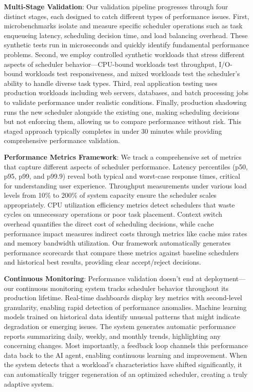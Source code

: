 \textbf{Multi-Stage Validation}: Our validation pipeline progresses through four distinct stages, each designed to catch different types of performance issues. First, microbenchmarks isolate and measure specific scheduler operations such as task enqueueing latency, scheduling decision time, and load balancing overhead. These synthetic tests run in microseconds and quickly identify fundamental performance problems. Second, we employ controlled synthetic workloads that stress different aspects of scheduler behavior—CPU-bound workloads test throughput, I/O-bound workloads test responsiveness, and mixed workloads test the scheduler's ability to handle diverse task types. Third, real application testing uses production workloads including web servers, databases, and batch processing jobs to validate performance under realistic conditions. Finally, production shadowing runs the new scheduler alongside the existing one, making scheduling decisions but not enforcing them, allowing us to compare performance without risk. This staged approach typically completes in under 30 minutes while providing comprehensive performance validation.

\textbf{Performance Metrics Framework}: We track a comprehensive set of metrics that capture different aspects of scheduler performance. Latency percentiles (p50, p95, p99, and p99.9) reveal both typical and worst-case response times, critical for understanding user experience. Throughput measurements under various load levels from 10\% to 200\% of system capacity ensure the scheduler scales appropriately. CPU utilization efficiency metrics detect schedulers that waste cycles on unnecessary operations or poor task placement. Context switch overhead quantifies the direct cost of scheduling decisions, while cache performance impact measures indirect costs through metrics like cache miss rates and memory bandwidth utilization. Our framework automatically generates performance scorecards that compare these metrics against baseline schedulers and historical best results, providing clear accept/reject decisions.

\textbf{Continuous Monitoring}: Performance validation doesn't end at deployment—our continuous monitoring system tracks scheduler behavior throughout its production lifetime. Real-time dashboards display key metrics with second-level granularity, enabling rapid detection of performance anomalies. Machine learning models trained on historical data identify unusual patterns that might indicate degradation or emerging issues. The system generates automatic performance reports summarizing daily, weekly, and monthly trends, highlighting any concerning changes. Most importantly, a feedback loop channels this performance data back to the AI agent, enabling continuous learning and improvement. When the system detects that a workload's characteristics have shifted significantly, it can automatically trigger regeneration of an optimized scheduler, creating a truly adaptive system.

